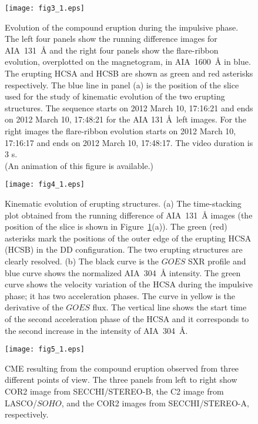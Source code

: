 \documentclass{aastex62}
\begin{document}
\begin{figure}[h]
\centering
\texttt{[image: fig3\_1.eps]}
\caption{Evolution of the compound eruption during the impulsive phase. The left four panels show the running difference images for AIA~131~\AA{} and the right four panels show the flare-ribbon evolution, overplotted on the magnetogram, in AIA~1600~\AA{} in blue. The erupting HCSA and HCSB are shown as green and red asterisks respectively. The blue line in panel (a) is the position of the slice used for the study of kinematic evolution of the two erupting structures.
The sequence starts on 2012 March 10, 17:16:21 and ends on 2012 March 10, 17:48:21 for the AIA 131 \AA\ left images. 
For the right images the flare-ribbon evolution starts on 2012 March 10, 17:16:17 
and ends on 2012 March 10, 17:48:17.  The video duration is 3 s.\\
(An animation of this figure is available.)
}
\label{fig:impulsive_phase}
\end{figure}


\begin{figure}[h]
\centering
\texttt{[image: fig4\_1.eps]}
\caption{Kinematic evolution of erupting structures. (a) The time-stacking plot obtained from the running difference of AIA~131~\AA{} images (the position of the slice is shown in Figure~\ref{fig:impulsive_phase}(a)). The green (red) asterisks mark the positions of the outer edge of the erupting HCSA (HCSB) in the DD configuration. The two erupting structures are clearly resolved. (b) The black curve is the $\textit{GOES}$ SXR profile and blue curve shows the normalized AIA~304~\AA{} intensity. The green curve shows the velocity variation of the HCSA during the impulsive phase; it has two acceleration phases. The curve in yellow is the derivative of the $\textit{GOES}$ flux. The vertical line shows the start time of the second acceleration phase of the HCSA and it corresponds to the second increase in the intensity of AIA~304~\AA.}
\label{fig:two_phase}
\end{figure}
\begin{figure}[h]
\centering
\texttt{[image: fig5\_1.eps]}
\caption{CME resulting from the compound eruption observed from three different points of view. The three panels from left to right show COR2 image from SECCHI/STEREO-B, the C2 image from  LASCO/$\textit{SOHO}$, and the COR2 images from SECCHI/STEREO-A, respectively.}
\label{fig:corona}
\end{figure}
\end{document}
